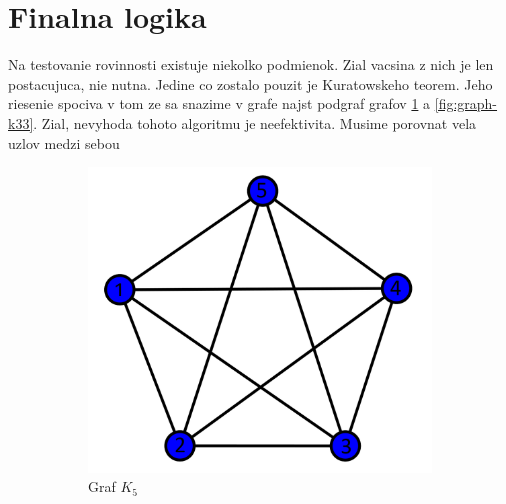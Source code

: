 \section{Finalna logika}

Na testovanie rovinnosti existuje niekolko podmienok.
Zial vacsina z nich je len postacujuca, nie nutna.
Jedine co zostalo pouzit je Kuratowskeho teorem. Jeho riesenie spociva v tom ze sa snazime v grafe najst podgraf grafov
\ref{fig:graph-k5} a \ref{fig:graph-k33}. Zial, nevyhoda tohoto algoritmu je neefektivita. Musime porovnat vela uzlov medzi sebou

\begin{figure}[h]
    \centering
    \begin{subfigure}[b]{0.4\textwidth}
        \centering
        \includegraphics[width=\textwidth]{doc/fig/K5.png}
        \caption{Graf $K_5$}
        \label{fig:graph-k5}
    \end{subfigure}
    \hfill
    \begin{subfigure}[b]{0.3\textwidth}
        \centering

\end{subfigure}
\end{figure}
